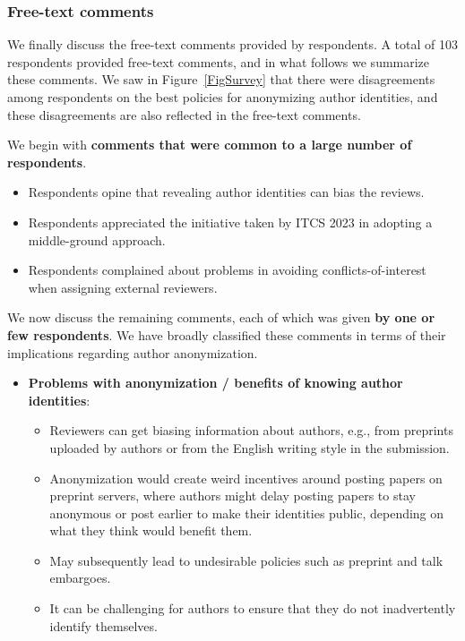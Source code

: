 \documentclass{article}
\newcommand{\rev}[1]{{\color{black}#1}}
\begin{document}
\subsubsection{Free-text comments} 

We finally discuss the free-text comments provided by respondents. A total of 103 respondents provided free-text comments, and in what follows we summarize these comments. We saw in Figure~\ref{FigSurvey} that there were disagreements among respondents on the best policies for anonymizing author identities, and these disagreements are also reflected in the free-text comments.

We begin with {\bf comments that were common to a large number of respondents}.
\rev{
\begin{itemize}
    \item Respondents opine that revealing author identities can bias the reviews. 
    \item Respondents appreciated the initiative taken by ITCS 2023 in adopting a middle-ground approach. 
    \item Respondents complained about problems in avoiding conflicts-of-interest when assigning external reviewers. 
\end{itemize}

\noindent We now discuss the remaining comments, each of which was given {\bf by one or few respondents}.  We have broadly classified these comments in terms of their implications regarding author anonymization.  
\begin{itemize}
\item {\bf Problems with anonymization / benefits of knowing author identities}: 
    \begin{itemize}
                     \item Reviewers can get biasing information about authors, e.g., from preprints uploaded by authors or from the English writing style in the submission.


        \item Anonymization would create weird incentives around posting papers on preprint servers, where authors might delay posting papers to stay anonymous or post earlier to make their identities public, depending on what they think would benefit them.

        \item May subsequently lead to undesirable policies such as preprint and talk embargoes. 

        \item It can be challenging for authors to ensure that they do not inadvertently identify themselves.


\end{itemize}
\end{itemize}}
\end{document}

